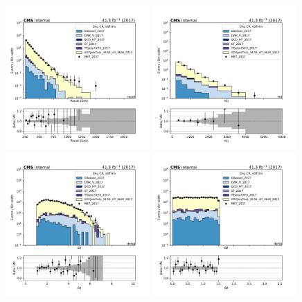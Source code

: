 \begin{figure}[htbp]
    \begin{center}
        \includegraphics[width=0.49\textwidth]{fig/datamc/cr_2m_vbf/cr_2m_vbf_recoil_losf_2017.pdf}
        \includegraphics[width=0.49\textwidth]{fig/datamc/cr_2m_vbf/cr_2m_vbf_mjj_losf_2017.pdf} \\
        \includegraphics[width=0.49\textwidth]{fig/datamc/cr_2m_vbf/cr_2m_vbf_detajj_losf_2017.pdf}
        \includegraphics[width=0.49\textwidth]{fig/datamc/cr_2m_vbf/cr_2m_vbf_dphijj_losf_2017.pdf}

\end{center}
\end{figure}
